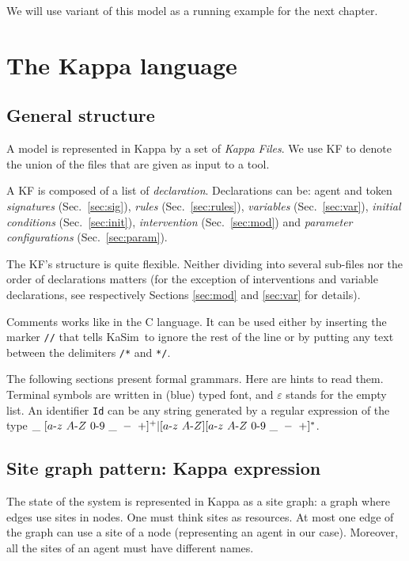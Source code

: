 \documentclass[11pt]{book}
\def\KaSim{\textsf{KaSim}}
\def\sep{\hbox{-}}
\def\ttt#1{\texttt{#1}}
\begin{document}
We will use variant of this model as a running example for the next chapter.

\chapter{The Kappa language}\label{chap:kappa}

\section{General structure}
A model is represented in Kappa by a set of \emph{Kappa Files}. We use
KF to denote the union of the files that are given
as input to a tool.

A KF is composed of a list of
\emph{declaration}.
Declarations can be: agent and token \emph{signatures}
(Sec.~\ref{sec:sig}), \emph{rules} (Sec.~\ref{sec:rules}),
\emph{variables} (Sec.~\ref{sec:var}), \emph{initial
  conditions} (Sec.~\ref{sec:init}),
\emph{intervention} (Sec.~\ref{sec:mod}) and
\emph{parameter configurations} (Sec.~\ref{sec:param}).

The KF's structure is quite flexible. Neither
dividing into several sub-files nor the order of
declarations matters (for the exception of
interventions and variable declarations, see
respectively Sections \ref{sec:mod} and \ref{sec:var} for details).

Comments works like in the C language. It can be used
either by inserting the marker \ttt{//} that tells \KaSim~to ignore
the rest of the line or by putting any text between the delimiters
\ttt{/*} and \ttt{*/}.

The following sections present formal grammars. Here are hints to read
them.  Terminal symbols are written in (blue) typed font, and
$\varepsilon$ stands for the empty list. An identifier \ttt{Id} can be
any string generated by a regular expression of the type
$\_\ [a\sep z\ A \sep Z\ 0\sep 9\ \_\ -\ +]^+ |
[ a\sep z\ A\sep Z][a\sep z\ A \sep Z\ 0\sep 9\ \_\ -\ +]^*$.

\section{Site graph pattern: Kappa expression}

The state of the system is represented in Kappa as a site graph: a
graph where edges use sites in nodes. One must think sites as
resources. At most one edge of the graph can use a site of a node
(representing an agent in our case). Moreover, all the sites of an
agent must have different names.
\end{document}
